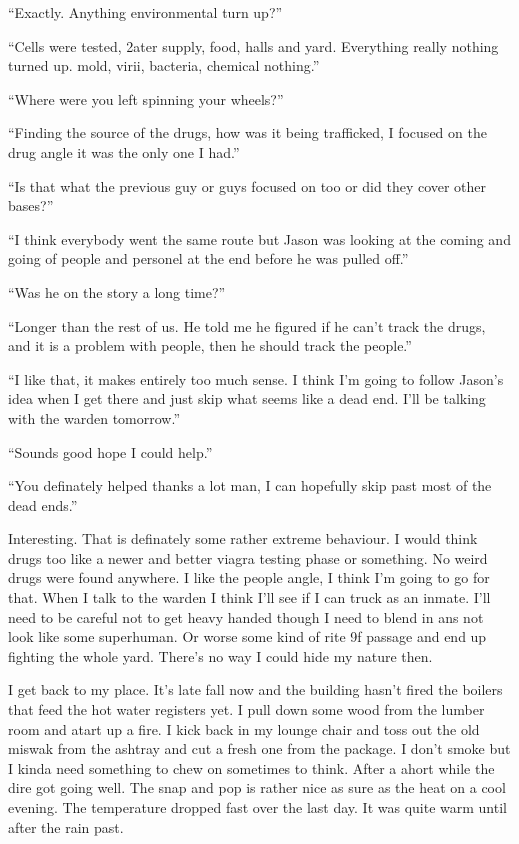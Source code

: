 ``Exactly. Anything environmental turn up?''

``Cells were tested, 2ater supply, food, halls and yard. Everything really nothing turned up. mold, virii, bacteria, chemical nothing.''

``Where were you left spinning your wheels?''

``Finding the source of the drugs, how was it being trafficked, I focused on the drug angle it was the only one I had.''

``Is that what the previous guy or guys focused on too or did they cover other bases?''

``I think everybody went the same route but Jason was looking at the coming and going of people and personel at the end before he was pulled off.''

``Was he on the story a long time?''

``Longer than the rest of us. He told me he figured if he can't track the drugs, and it is a problem with people, then he should track the people.''

``I like that, it makes entirely too much sense. I think I'm going to follow Jason's idea when I get there and just skip what seems like a dead end. I'll be talking with the warden tomorrow.''

``Sounds good hope I could help.''

``You definately helped thanks a lot man, I can hopefully skip past most of the dead ends.''

Interesting. That is definately some rather extreme behaviour. I would think drugs too like a newer and better viagra testing phase or something. No weird drugs were found anywhere. I like the people angle, I think I'm going to go for that. When I talk to the warden I think I'll see if I can truck as an inmate. I'll need to be careful not to get heavy handed though I need to blend in ans not look like some superhuman. Or worse some kind of rite 9f passage and end up fighting the whole yard. There's no way I could hide my nature then.

I get back to my place. It's late fall now and the building hasn't fired the boilers that feed the hot water registers yet. I pull down some wood from the lumber room and atart up a fire. I kick back in my lounge chair and toss out the old miswak from the ashtray and cut a fresh one from the package. I don't smoke but I kinda need something to chew on sometimes to think. After a ahort while the dire got going well. The snap and pop is rather nice as sure as the heat on a cool evening. The temperature dropped fast over the last day. It was quite warm until after the rain past.

